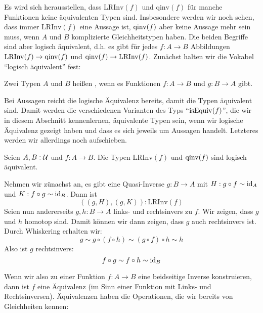 Es wird sich herausstellen, dass $\mathrm{LRInv}(f)$ und $\mathrm{qinv}(f)$ für manche Funktionen keine äquivalenten Typen sind.
Insbesondere werden wir noch sehen, dass immer $\mathrm{LRInv}(f)$ eine Aussage ist, $\mathrm{qinv}(f)$ aber keine Aussage mehr sein muss, wenn $A$ und $B$ komplizierte Gleichheitstypen haben.
Die beiden Begriffe sind aber logisch äquivalent, d.h. es gibt für jedes $f:A\to B$ Abbildungen $\mathrm{LRInv}(f)\to \mathrm{qinv}(f)$ und $\mathrm{qinv}(f)\to\mathrm{LRInv}(f)$.
Zunächst halten wir die Vokabel ``logisch äquivalent'' fest:

\begin{definition}
  Zwei Typen $A$ und $B$ heißen , wenn es Funktionen $f:A\to B$ und $g:B\to A$ gibt.
\end{definition}

Bei Aussagen reicht die logische Äquivalenz bereits, damit die Typen äquivalent sind.
Damit werden die verschiedenen Varianten des Typs ``$\mathrm{isEquiv}(f)$'', die wir in diesem Abschnitt kennenlernen, äquivalente Typen sein,
wenn wir logische Äquivalenz gezeigt haben und dass es sich jeweils um Aussagen handelt. Letzteres werden wir allerdings noch aufschieben.

\begin{bemerkung}
  \label{bem:lrinv-qinv}
  Seien $A,B:\mathcal{U}$ und $f:A\to B$. Die Typen $\mathrm{LRInv}(f)$ und $\mathrm{qinv}(f)$ sind logisch äquivalent.
\end{bemerkung}
\begin{beweis}
  Nehmen wir zünachst an, es gibt eine Quasi-Inverse $g:B\to A$ mit $H:g\circ f\sim\mathrm{id}_A$ und $K:f\circ g\sim\mathrm{id}_B$. Dann ist
  \[
    ((g,H),(g,K)):\mathrm{LRInv}(f)
  \]
  Seien nun andererseits $g,h:B\to A$ links- und rechtsinvers zu $f$. Wir zeigen, dass $g$ und $h$ homotop sind. Damit können wir dann zeigen, dass $g$ auch rechtsinvers ist.
  Durch Whiskering erhalten wir:
  \[
    g\sim g\circ (f\circ h) \sim (g\circ f)\circ h  \sim h
  \]
  Also ist $g$ rechtsinvers:
  \[
    f\circ g\sim f\circ h\sim \mathrm{id}_B
  \]
\end{beweis}

Wenn wir also zu einer Funktion $f:A\to B$ eine beidseitige Inverse konstruieren, dann ist $f$ eine Äquivalenz (im Sinn einer Funktion mit Links- und Rechtsinversen).
Äquivalenzen haben die Operationen, die wir bereits von Gleichheiten kennen:

